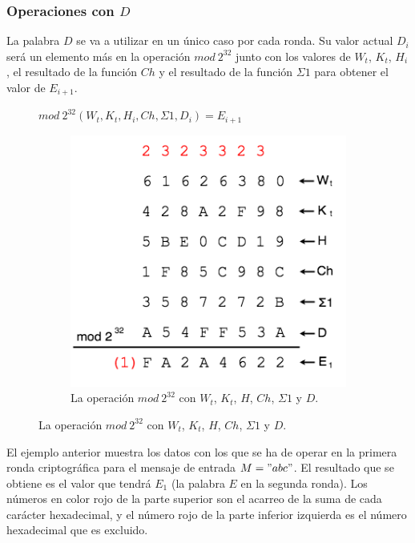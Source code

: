 \documentclass{article}
\begin{document}
        \subsubsection{Operaciones con $D$}
            La palabra $D$ se va a utilizar en un único caso por cada ronda. Su valor actual $D_{i}$ será un elemento más en la operación $mod \ 2^{32}$ junto con los valores de $W_{t}$, $K_{t}$, $H_{i}$, el resultado de la función $Ch$ y el resultado de la función $\Sigma1$ para obtener el valor de $E_{i+1}$.
                \begin{figure}[H]
                \centering
                    $mod \ 2^{32} (W_{t}, K_{t}, H_{i}, Ch, \Sigma1, D_{i}) = E_{i+1}$
                    
                    \begin{figure}[H]
                    \centering
                        \includegraphics[scale=0.41]{img/SHA-256-operations_D.png}
                        \caption{La operación $mod \ 2^{32}$ con $W_{t}$, $K_{t}$, $H$, $Ch$, $\Sigma1$ y $D$.}
                    \end{figure}
                \end{figure}
            El ejemplo anterior muestra los datos con los que se ha de operar en la primera ronda criptográfica para el mensaje de entrada $M = "abc"$. El resultado que se obtiene es el valor que tendrá $E_{1}$ (la palabra $E$ en la segunda ronda). Los números en color rojo de la parte superior son el acarreo de la suma de cada carácter hexadecimal, y el número rojo de la parte inferior izquierda es el número hexadecimal que es excluido.
            
\end{document}
